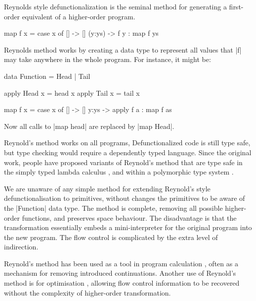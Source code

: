 \documentclass[preprint]{sigplanconf}
\begin{document}
Reynolds style defunctionalization \cite{reynolds:defunc} is the seminal method for generating a first-order equivalent of a higher-order program.

\begin{example}
\begin{code}
map f x = case  x of
                []      -> []
                (y:ys)  -> f y : map f ys
\end{code}

\noindent Reynolds method works by creating a data type to represent all values that |f| may take anywhere in the whole program. For instance, it might be:

\begin{code}
data Function = Head | Tail

apply Head  x = head  x
apply Tail  x = tail  x

map f x = case  x of
                []    -> []
                y:ys  -> apply f a : map f as
\end{code}

\noindent Now all calls to |map head| are replaced by |map Head|.
\end{example}

Reynold's method works on all programs, Defunctionalized code is still type safe, but type checking would require a dependently typed language. Since the original work, people have proposed variants of Reynold's method that are type safe in the simply typed lambda calculus \cite{bell:type_driven_defunctionalization}, and within a polymorphic type system \cite{pottier:polymorhpic_typed_defunctionaization}.

We are unaware of any simple method for extending Reynold's style defunctionalisation to primitives, without changes the primitives to be aware of the |Function| data type. The method is complete, removing all possible higher-order functions, and preserves space behaviour. The disadvantage is that the transformation essentially embeds a mini-interpreter for the original program into the new program. The flow control is complicated by the extra level of indirection.

Reynold's method has been used as a tool in program calculation \cite{danvy:defunctionalization_at_work,hutton:calculating_an_exceptional_machine}, often as a mechanism for removing introduced continuations. Another use of Reynold's method is for optimisation \cite{grin,jhc}, allowing flow control information to be recovered without the complexity of higher-order transformation.
\end{document}
